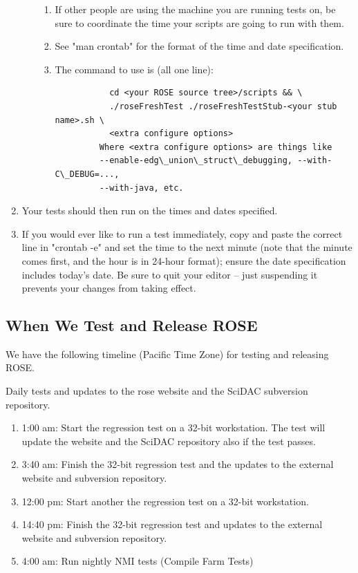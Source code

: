 \begin{enumerate}
\begin{enumerate}
\begin{enumerate}
         \item If other people are using the machine you are running tests on, be
               sure to coordinate the time your scripts are going to run with them.
         \item See "man crontab" for the format of the time and date specification.
         \item The command to use is (all one line):
\begin{verbatim}
           cd <your ROSE source tree>/scripts && \
           ./roseFreshTest ./roseFreshTestStub-<your stub name>.sh \
           <extra configure options>
         Where <extra configure options> are things like
         --enable-edg\_union\_struct\_debugging, --with-C\_DEBUG=...,
         --with-java, etc.
\end{verbatim}
      \end{enumerate}
   \end{enumerate}
   \item Your tests should then run on the times and dates specified.
   \item If you would ever like to run a test immediately, copy and paste the
   correct line in "crontab -e" and set the time to the next minute (note
   that the minute comes first, and the hour is in 24-hour format); ensure
   the date specification includes today's date.  Be sure to quit your
   editor -- just suspending it prevents your changes from taking effect.
\end{enumerate}

\subsection{When We Test and Release ROSE}
We have the following timeline (Pacific Time Zone) for testing and 
releasing ROSE.

Daily tests and updates to the rose website and the SciDAC subversion
repository.
\begin{enumerate}
\item 1:00 am: Start the regression test on a 32-bit workstation. The test
will update the website and the SciDAC repository also if the test
passes.
\item 3:40 am: Finish the 32-bit regression test and the updates to the external website
and subversion repository.
\item 12:00 pm: Start another the regression test on a 32-bit workstation.
\item 14:40 pm: Finish the 32-bit regression test and updates to the external website
and subversion repository.
\item 4:00 am: Run nightly NMI tests (Compile Farm Tests)
\end{enumerate}

